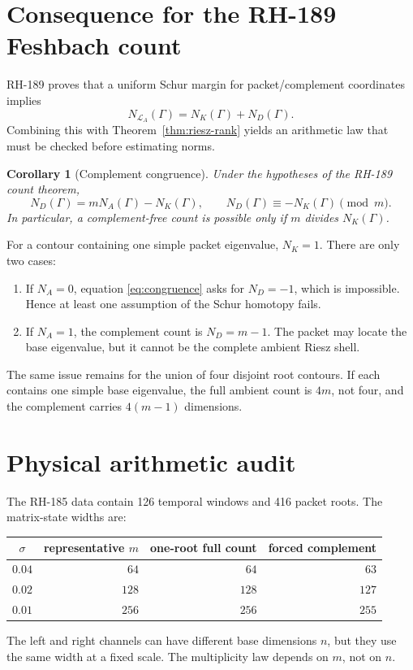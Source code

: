 \documentclass[12pt]{article}
\newtheorem{corollary}[theorem]{Corollary}
\theoremstyle{remark}
\newcommand{\cL}{\mathcal L}
\begin{document}
\section{Consequence for the RH-189 Feshbach count}

RH-189 proves that a uniform Schur margin for packet/complement coordinates
implies
\begin{equation}\label{eq:feshbach-count}
 N_{\cL_A}(\Gamma)=N_K(\Gamma)+N_D(\Gamma).
\end{equation}
Combining this with Theorem~\ref{thm:riesz-rank} yields an arithmetic law
that must be checked before estimating norms.

\begin{corollary}[Complement congruence]\label{cor:congruence}
Under the hypotheses of the RH-189 count theorem,
\begin{equation}\label{eq:congruence}
 N_D(\Gamma)=mN_A(\Gamma)-N_K(\Gamma),
 \qquad
 N_D(\Gamma)\equiv-N_K(\Gamma)\pmod m.
\end{equation}
In particular, a complement-free count is possible only if $m$ divides
$N_K(\Gamma)$.
\end{corollary}

For a contour containing one simple packet eigenvalue, $N_K=1$.  There are
only two cases:
\begin{enumerate}[leftmargin=2em]
\item If $N_A=0$, equation \eqref{eq:congruence} asks for $N_D=-1$, which is
 impossible.  Hence at least one assumption of the Schur homotopy fails.
\item If $N_A=1$, the complement count is $N_D=m-1$.  The packet may locate
 the base eigenvalue, but it cannot be the complete ambient Riesz shell.
\end{enumerate}

The same issue remains for the union of four disjoint root contours.  If
each contains one simple base eigenvalue, the full ambient count is $4m$,
not four, and the complement carries $4(m-1)$ dimensions.

\section{Physical arithmetic audit}

The RH-185 data contain 126 temporal windows and 416 packet roots.  The
matrix-state widths are:
\begin{center}
\begin{tabular}{crrr}
\toprule
$\sigma$ & representative $m$ & one-root full count & forced complement\\
\midrule
$0.04$ & $64$ & $64$ & $63$\\
$0.02$ & $128$ & $128$ & $127$\\
$0.01$ & $256$ & $256$ & $255$\\
\bottomrule
\end{tabular}
\end{center}
The left and right channels can have different base dimensions $n$, but
they use the same width at a fixed scale.  The multiplicity law depends on
$m$, not on $n$.
\end{document}
